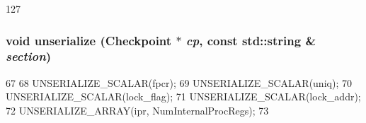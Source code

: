 \begin{DoxyCode}
127 {}
\end{DoxyCode}
\hypertarget{classAlphaISA_1_1ISA_af22e5d6d660b97db37003ac61ac4ee49}{
\subsubsection[{unserialize}]{\setlength{\rightskip}{0pt plus 5cm}void unserialize ({\bf Checkpoint} $\ast$ {\em cp}, \/  const std::string \& {\em section})}}
\label{classAlphaISA_1_1ISA_af22e5d6d660b97db37003ac61ac4ee49}



\begin{DoxyCode}
67 {
68     UNSERIALIZE_SCALAR(fpcr);
69     UNSERIALIZE_SCALAR(uniq);
70     UNSERIALIZE_SCALAR(lock_flag);
71     UNSERIALIZE_SCALAR(lock_addr);
72     UNSERIALIZE_ARRAY(ipr, NumInternalProcRegs);
73 }
\end{DoxyCode}


